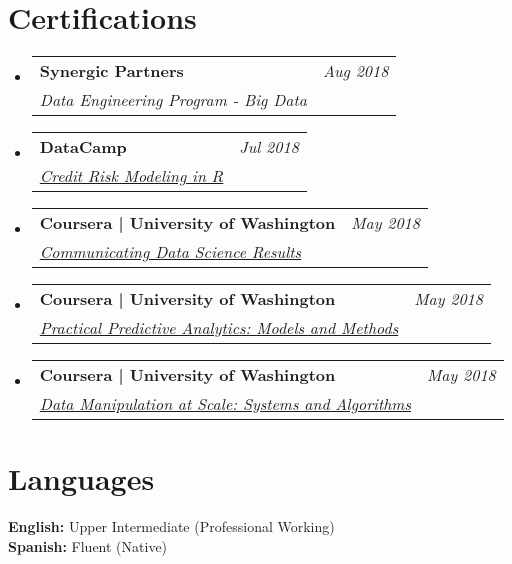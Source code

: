 \documentclass[letterpaper,11pt]{article}
\makeatletter
\newcommand{\resumeCertificationHeading}[4]{
  \vspace{-2pt}\item
  \begin{tabular*}{0.97\textwidth}[t]{l@{\extracolsep{\fill}}r}
    \textbf{#1} & \textit{\small #2} \\
    \textit{\small#3}
  \end{tabular*}\vspace{-7pt}
}
\newcommand{\resumeSubHeadingListStart}{\begin{itemize}[leftmargin=0.15in, label={}]}
\newcommand{\resumeSubHeadingListEnd}{\end{itemize}}
\makeatother
\begin{document}
\section*{Certifications}
    \vspace{3pt}
    \resumeSubHeadingListStart
        \resumeCertificationHeading
        {Synergic Partners}{Aug 2018}{Data Engineering Program - Big Data} \\ \vspace{3pt}
        \resumeCertificationHeading
        {DataCamp}{Jul 2018}{\href{https://www.datacamp.com/statement-of-accomplishment/course/570aea98df0efb32a187e8827252a6e45461ef1f}{Credit Risk Modeling in R}} \\ \vspace{3pt}
        \resumeCertificationHeading
        {Coursera | University of Washington}{May 2018}{\href{https://www.coursera.org/account/accomplishments/verify/Q6FA9BCRNPDD}{Communicating Data Science Results}} \\ \vspace{3pt}
        \resumeCertificationHeading
        {Coursera | University of Washington}{May 2018}{\href{https://www.coursera.org/account/accomplishments/verify/AWPU7U793JRS}{Practical Predictive Analytics: Models and Methods}} \\ \vspace{3pt}
        \resumeCertificationHeading
        {Coursera | University of Washington}{May 2018}{\href{https://www.coursera.org/account/accomplishments/verify/QRZJQH9JU9XW}{Data Manipulation at Scale: Systems and Algorithms}} \\ \vspace{3pt}
    \resumeSubHeadingListEnd

\section*{Languages}
    \vspace{3pt}
    \resumeSubHeadingListStart
        \small{\item{
            \textbf{English:}{ Upper Intermediate (Professional Working)} \\ \vspace{3pt}
            \textbf{Spanish:}{ Fluent (Native)} \\ \vspace{3pt}
        }}
    \resumeSubHeadingListEnd
\end{document}

